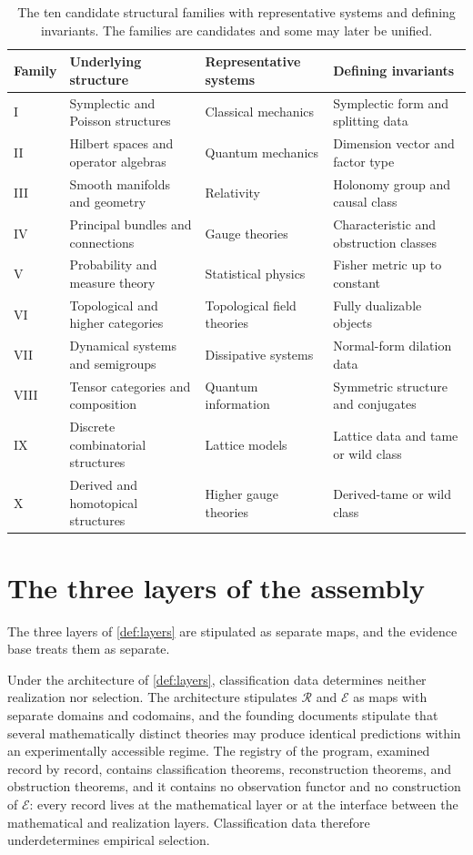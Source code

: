 \documentclass[11pt,letterpaper]{article}
\theoremstyle{definition}
\begin{document}
\begin{table}[htbp]
\caption{The ten candidate structural families with representative systems and defining invariants. The families are candidates and some may later be unified.}
\label{tab:families}
\small
\begin{tabularx}{\textwidth}{>{\hsize=0.35\hsize\raggedright\arraybackslash}X >{\hsize=1.4\hsize\raggedright\arraybackslash}X >{\hsize=0.95\hsize\raggedright\arraybackslash}X >{\hsize=1.3\hsize\raggedright\arraybackslash}X}
\toprule
Family & Underlying structure & Representative systems & Defining invariants \\
\midrule
I & Symplectic and Poisson structures & Classical mechanics & Symplectic form and splitting data \\
II & Hilbert spaces and operator algebras & Quantum mechanics & Dimension vector and factor type \\
III & Smooth manifolds and geometry & Relativity & Holonomy group and causal class \\
IV & Principal bundles and connections & Gauge theories & Characteristic and obstruction classes \\
V & Probability and measure theory & Statistical physics & Fisher metric up to constant \\
VI & Topological and higher categories & Topological field theories & Fully dualizable objects \\
VII & Dynamical systems and semigroups & Dissipative systems & Normal-form dilation data \\
VIII & Tensor categories and composition & Quantum information & Symmetric structure and conjugates \\
IX & Discrete combinatorial structures & Lattice models & Lattice data and tame or wild class \\
X & Derived and homotopical structures & Higher gauge theories & Derived-tame or wild class \\
\bottomrule
\end{tabularx}
\end{table}

\section{The three layers of the assembly}

The three layers of \cref{def:layers} are stipulated as separate maps, and the evidence base treats them as separate.

Under the architecture of \cref{def:layers}, classification data determines neither realization nor selection. The architecture stipulates $\mathcal{R}$ and $\mathcal{E}$ as maps with separate domains and codomains, and the founding documents stipulate that several mathematically distinct theories may produce identical predictions within an experimentally accessible regime. The registry of the program, examined record by record, contains classification theorems, reconstruction theorems, and obstruction theorems, and it contains no observation functor and no construction of $\mathcal{E}$: every record lives at the mathematical layer or at the interface between the mathematical and realization layers. Classification data therefore underdetermines empirical selection.
\end{document}
